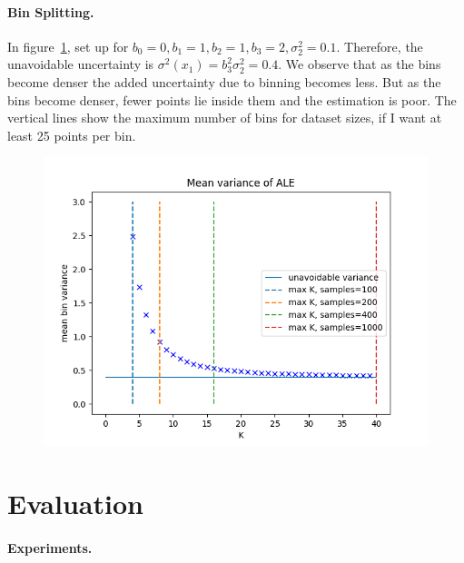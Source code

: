 \documentclass{article}
\begin{document}
\paragraph{Bin Splitting.}

In figure~\ref{fig:im2}, set up for
\(b_0=0, b_1=1, b_2=1, b_3=2, \sigma_2^2 = 0.1\).
Therefore, the
unavoidable uncertainty is \(\sigma^2(x_1) = b_3^2 \sigma_2^2 =
0.4\).
We observe that as the bins become denser the added
uncertainty due to binning becomes less.
But as the bins become denser, fewer points lie inside them and the estimation is poor.
The
vertical lines show the maximum number of bins for dataset sizes, if I
want at least 25 points per bin.


\begin{figure}[!h]
  \centering
  \includegraphics[width=.7\linewidth]{./example_gromping_paper/bin_varinace}
  \caption{}
  \label{fig:im2}
\end{figure}


\section{Evaluation}
\label{sec:evaluation}

\paragraph{Experiments.}

\end{document}
